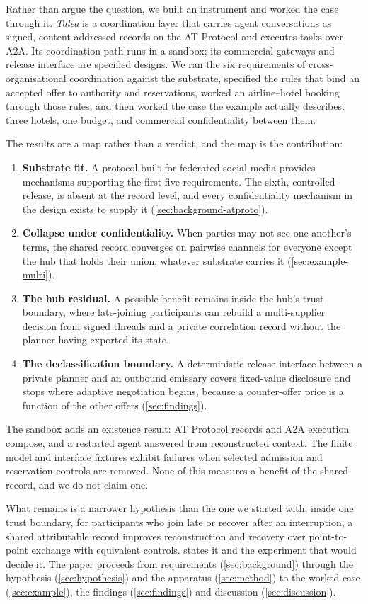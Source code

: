 Rather than argue the question, we built an instrument and worked the case through it. \emph{Talea} is a coordination layer that carries agent conversations as signed, content-addressed records on the AT Protocol and executes tasks over A2A. Its coordination path runs in a sandbox; its commercial gateways and release interface are specified designs. We ran the six requirements of cross-organisational coordination against the substrate, specified the rules that bind an accepted offer to authority and reservations, worked an airline--hotel booking through those rules, and then worked the case the example actually describes: three hotels, one budget, and commercial confidentiality between them.

The results are a map rather than a verdict, and the map is the contribution:
\begin{enumerate}[leftmargin=*]
  \item \textbf{Substrate fit.} A protocol built for federated social media provides mechanisms supporting the first five requirements. The sixth, controlled release, is absent at the record level, and every confidentiality mechanism in the design exists to supply it (\cref{sec:background-atproto}).
  \item \textbf{Collapse under confidentiality.} When parties may not see one another's terms, the shared record converges on pairwise channels for everyone except the hub that holds their union, whatever substrate carries it (\cref{sec:example-multi}).
  \item \textbf{The hub residual.} A possible benefit remains inside the hub's trust boundary, where late-joining participants can rebuild a multi-supplier decision from signed threads and a private correlation record without the planner having exported its state.
  \item \textbf{The declassification boundary.} A deterministic release interface between a private planner and an outbound emissary covers fixed-value disclosure and stops where adaptive negotiation begins, because a counter-offer price is a function of the other offers (\cref{sec:findings}).
\end{enumerate}
The sandbox adds an existence result: AT Protocol records and A2A execution compose, and a restarted agent answered from reconstructed context. The finite model and interface fixtures exhibit failures when selected admission and reservation controls are removed. None of this measures a benefit of the shared record, and we do not claim one.

What remains is a narrower hypothesis than the one we started with: inside one trust boundary, for participants who join late or recover after an interruption, a shared attributable record improves reconstruction and recovery over point-to-point exchange with equivalent controls.  states it and the experiment that would decide it. The paper proceeds from requirements (\cref{sec:background}) through the hypothesis (\cref{sec:hypothesis}) and the apparatus (\cref{sec:method}) to the worked case (\cref{sec:example}), the findings (\cref{sec:findings}) and discussion (\cref{sec:discussion}).
